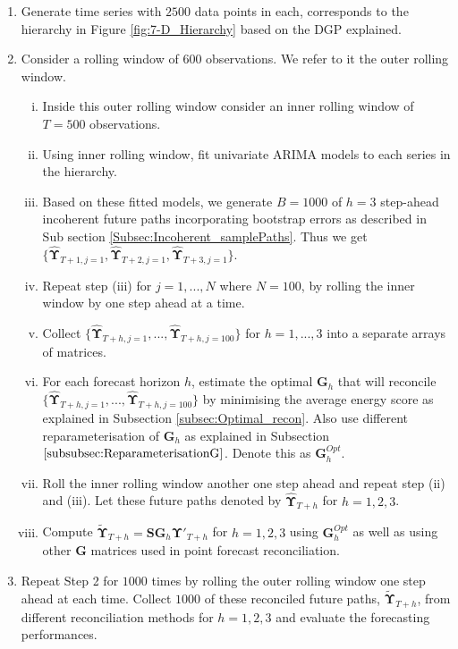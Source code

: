 \begin{enumerate}
    \item Generate time series with $2500$ data points in each, corresponds to the hierarchy in Figure \ref{fig:7-D_Hierarchy} based on the DGP explained. 
\item Consider a rolling window of $600$ observations. We refer to it the outer rolling window. 
\begin{enumerate}[i.]
	\item Inside this outer rolling window consider an inner rolling window of $T=500$ observations. 
	\item Using inner rolling window, fit univariate ARIMA models to each series in the hierarchy.
	\item Based on these fitted models, we generate $B=1000$ of $h=3$ step-ahead incoherent future paths incorporating bootstrap errors as described in Sub section \ref{Subsec:Incoherent_samplePaths}. Thus we get $\{\hat{\bm{\Upsilon}}_{T+1,j=1}, \hat{\bm{\Upsilon}}_{T+2,j=1}, \hat{\bm{\Upsilon}}_{T+3,j=1}\}$. 
	\item Repeat step (iii) for $j=1,...,N$ where $N=100$, by rolling the inner window by one step ahead at a time. 
	\item Collect $\{\hat{\bm{\Upsilon}}_{T+h,j=1},...,\hat{\bm{\Upsilon}}_{T+h,j=100}\}$ for $h=1,...,3$ into a separate arrays of matrices. 
	\item For each forecast horizon $h$, estimate the optimal $\bm{G}_h$ that will reconcile $\{\hat{\bm{\Upsilon}}_{T+h,j=1},...,\hat{\bm{\Upsilon}}_{T+h,j=100}\}$ by minimising the average energy score as explained in Subsection \ref{subsec:Optimal_recon}. Also use different reparameterisation of $\bm{G}_h$ as explained in Subsection $\ref{subsubsec:ReparameterisationG}$. Denote this as $\bm{G}^{Opt}_h$. 
	\item Roll the inner rolling window another one step ahead and repeat step (ii) and (iii). Let these future paths denoted by $\hat{\bm{\Upsilon}}_{T+h}$ for $h=1,2,3$. 
	\item Compute $\tilde{\bm{\Upsilon}}_{T+h} = \bm{SG}_h\hat{\bm{\Upsilon}}'_{T+h}$ for $h=1,2,3$ using $\bm{G}^{Opt}_h$ as well as using other $\bm{G}$ matrices used in point forecast reconciliation.
	
\end{enumerate}

\item Repeat Step 2 for $1000$ times by rolling the outer rolling window one step ahead at each time. Collect $1000$ of these reconciled future paths, $\tilde{\bm{\Upsilon}}_{T+h}$, from different reconciliation methods for $h=1,2,3$ and evaluate the forecasting performances. 
\end{enumerate}

